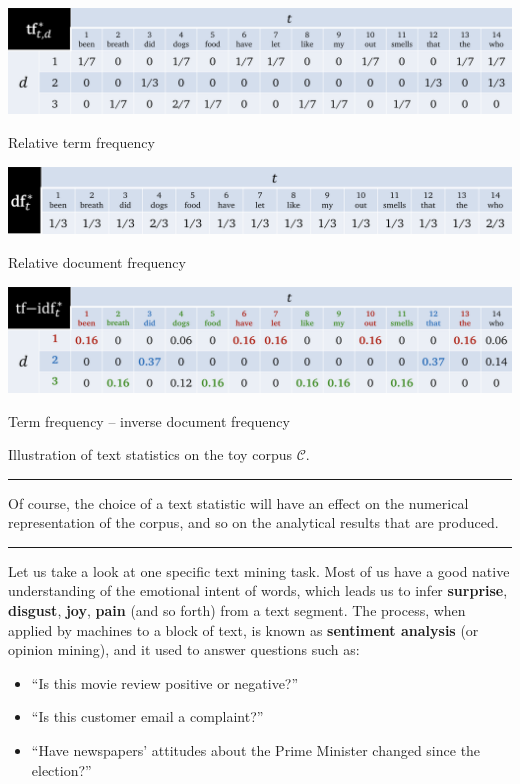 \begin{table}[!t]
\centering
\begin{subtable}[c]{\textwidth}
\includegraphics[width=\textwidth]{images/DSML/TMTF.png}\caption{\small Relative term frequency}\label{tab:tmtf}
\end{subtable}
\begin{subtable}[c]{\textwidth}
\includegraphics[width=\textwidth]{images/DSML/TMDF.png}\caption{\small Relative document frequency}\label{tab:tmdf}
\end{subtable}
\begin{subtable}[c]{\textwidth}
\includegraphics[width=\textwidth]{images/DSML/TMTFIDF.png}\caption{\small Term frequency -- inverse document frequency}\label{tab:tmtfidf}
\end{subtable}\caption[\small Illustration of text statistics]{\small Illustration of text statistics on the toy corpus $\mathcal{C}$.}\hrule \label{tab:tfs}
\end{table}
Of course, the choice of a text statistic will have an effect on the numerical representation of the corpus, and so on the analytical results that are produced. 
\begin{center}\rule{0.5\linewidth}{.4pt}\end{center}
Let us take a look at one specific text mining task. Most of us have a good native understanding of the emotional intent of words, which leads us to infer \textbf{surprise}, \textbf{disgust}, \textbf{joy}, \textbf{pain} (and so forth) from a text segment. The process, when applied by machines to a block of text, is known as \textbf{sentiment analysis} (or opinion mining), and it used to answer questions such as:
\begin{itemize}[noitemsep]
\item ``Is this movie review positive or negative?''
\item ``Is this customer email a complaint?''
\item ``Have newspapers' attitudes about the Prime Minister changed since the election?''
\end{itemize}
